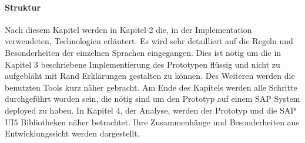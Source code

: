 \paragraph{Struktur}
Nach diesem Kapitel werden in Kapitel 2 die, in der Implementation verwendeten, Technologien erläutert. Es wird sehr detailliert auf die Regeln und Besonderheiten der einzelnen Sprachen eingegangen. Dies ist nötig um die in Kapitel 3 beschriebene Implementierung des Prototypen flüssig und nicht zu aufgebläht mit Rand Erklärungen gestalten zu können.  Des Weiteren werden die benutzten Tools kurz näher gebracht. Am Ende des Kapitels werden alle Schritte durchgeführt worden sein, die nötig sind um den Prototyp auf einem SAP System deployed zu haben. In Kapitel 4, der Analyse, werden der Prototyp und die SAP UI5 Bibliotheken näher betrachtet. Ihre Zusammenhänge und Besonderheiten aus Entwicklungssicht werden dargestellt.